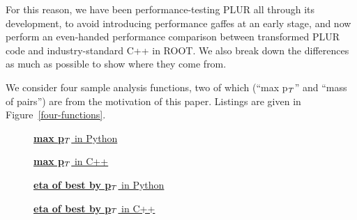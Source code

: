 \documentclass[10pt, conference, compsocconf]{IEEEtran}
\begin{document}
For this reason, we have been performance-testing PLUR all through its development, to avoid introducing performance gaffes at an early stage, and now perform an even-handed performance comparison between transformed PLUR code and industry-standard C++ in ROOT. We also break down the differences as much as possible to show where they come from.

We consider four sample analysis functions, two of which (``max p$_{\mbox{\scriptsize T}}$'' and ``mass of pairs'') are from the motivation of this paper. Listings are given in Figure~\ref{four-functions}.

\begin{figure}
\scriptsize

\noindent\begin{minipage}{\textwidth}
\begin{minipage}[c][1.8cm][t]{0.22\linewidth}
\underline{{\bf max p$_{\mbox{\tiny T}}$} in Python}

\end{minipage}
\begin{minipage}[c][1.8cm][t]{0.25\linewidth}
\underline{{\bf max p$_{\mbox{\tiny T}}$} in C++}

\end{minipage}

\vspace{0.25 cm}
\begin{minipage}[c][2.6cm][t]{0.22\linewidth}
\underline{{\bf eta of best by p$_{\mbox{\tiny T}}$} in Python}

\end{minipage}
\begin{minipage}[c][2.6cm][t]{0.25\linewidth}
\underline{{\bf eta of best by p$_{\mbox{\tiny T}}$} in C++}

\end{minipage}%


\end{minipage}
\end{figure}
\end{document}
